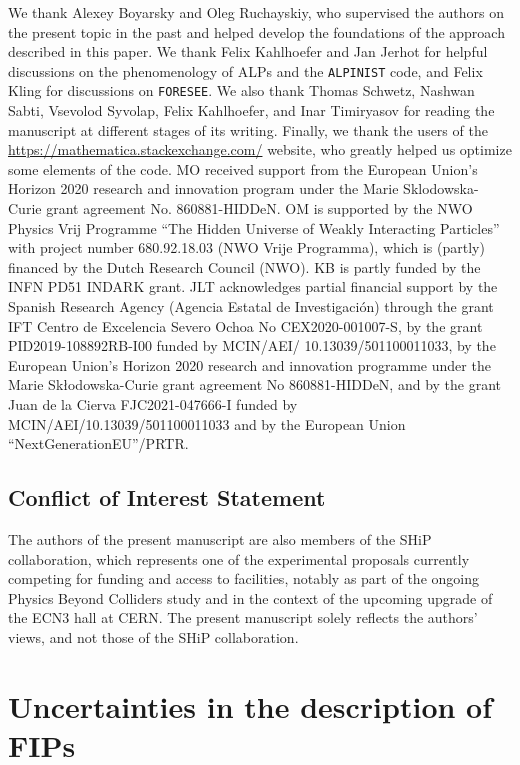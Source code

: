\documentclass[
    aps,prd,
    twocolumn,
    nofootinbib,
    superscriptaddress,
]{revtex4}
\begin{document}
\begin{acknowledgments}
We thank Alexey Boyarsky and Oleg Ruchayskiy, who supervised the authors on the present topic in the past and helped develop the foundations of the approach described in this paper. We thank Felix Kahlhoefer and Jan Jerhot for helpful discussions on the phenomenology of ALPs and the \texttt{ALPINIST} code, and Felix Kling for discussions on \texttt{FORESEE}. We also thank Thomas Schwetz, Nashwan Sabti, Vsevolod Syvolap, Felix Kahlhoefer, and Inar Timiryasov for reading the manuscript at different stages of its writing. Finally, we thank the users of the \url{https://mathematica.stackexchange.com/} website, who greatly helped us optimize some elements of the code. MO received support from the European Union's Horizon 2020 research and innovation program under the Marie Sklodowska-Curie grant agreement No. 860881-HIDDeN. OM is supported by the NWO Physics Vrij Programme “The Hidden Universe of Weakly Interacting Particles” with project number 680.92.18.03 (NWO Vrije Programma), which is (partly) financed by the Dutch Research Council (NWO). KB is partly funded by the INFN PD51 INDARK grant.
JLT acknowledges partial financial support by the Spanish Research Agency (Agencia Estatal de Investigaci\'on) through the grant IFT Centro de Excelencia Severo Ochoa No CEX2020-001007-S, by the grant PID2019-108892RB-I00 funded by MCIN/AEI/ 10.13039/501100011033, by the European Union's Horizon 2020 research and innovation programme under the Marie Sk\l odowska-Curie grant agreement No 860881-HIDDeN, and by the grant Juan de la Cierva FJC2021-047666-I funded by MCIN/AEI/10.13039/501100011033 and by the European Union ``NextGenerationEU''/PRTR.
\end{acknowledgments}

\subsection*{Conflict of Interest Statement}

The authors of the present manuscript are also members of the SHiP collaboration, which represents one of the experimental proposals currently competing for funding and access to facilities, notably as part of the ongoing Physics Beyond Colliders study and in the context of the upcoming upgrade of the ECN3 hall at CERN. The present manuscript solely reflects the authors' views, and not those of the SHiP collaboration.

\appendix

\section{Uncertainties in the description of FIPs}
\label{app:couplings-definitions}
\end{document}
